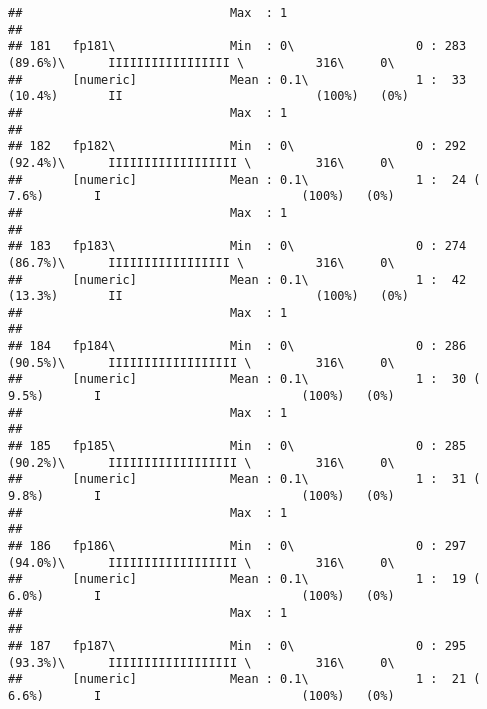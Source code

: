 \documentclass[]{article}
\begin{document}
\begin{verbatim}
##                             Max  : 1                                                                                       
## 
## 181   fp181\                Min  : 0\                 0 : 283 (89.6%)\      IIIIIIIIIIIIIIIII \          316\     0\       
##       [numeric]             Mean : 0.1\               1 :  33 (10.4%)       II                           (100%)   (0%)     
##                             Max  : 1                                                                                       
## 
## 182   fp182\                Min  : 0\                 0 : 292 (92.4%)\      IIIIIIIIIIIIIIIIII \         316\     0\       
##       [numeric]             Mean : 0.1\               1 :  24 ( 7.6%)       I                            (100%)   (0%)     
##                             Max  : 1                                                                                       
## 
## 183   fp183\                Min  : 0\                 0 : 274 (86.7%)\      IIIIIIIIIIIIIIIII \          316\     0\       
##       [numeric]             Mean : 0.1\               1 :  42 (13.3%)       II                           (100%)   (0%)     
##                             Max  : 1                                                                                       
## 
## 184   fp184\                Min  : 0\                 0 : 286 (90.5%)\      IIIIIIIIIIIIIIIIII \         316\     0\       
##       [numeric]             Mean : 0.1\               1 :  30 ( 9.5%)       I                            (100%)   (0%)     
##                             Max  : 1                                                                                       
## 
## 185   fp185\                Min  : 0\                 0 : 285 (90.2%)\      IIIIIIIIIIIIIIIIII \         316\     0\       
##       [numeric]             Mean : 0.1\               1 :  31 ( 9.8%)       I                            (100%)   (0%)     
##                             Max  : 1                                                                                       
## 
## 186   fp186\                Min  : 0\                 0 : 297 (94.0%)\      IIIIIIIIIIIIIIIIII \         316\     0\       
##       [numeric]             Mean : 0.1\               1 :  19 ( 6.0%)       I                            (100%)   (0%)     
##                             Max  : 1                                                                                       
## 
## 187   fp187\                Min  : 0\                 0 : 295 (93.3%)\      IIIIIIIIIIIIIIIIII \         316\     0\       
##       [numeric]             Mean : 0.1\               1 :  21 ( 6.6%)       I                            (100%)   (0%)     

\end{verbatim}
\end{document}
